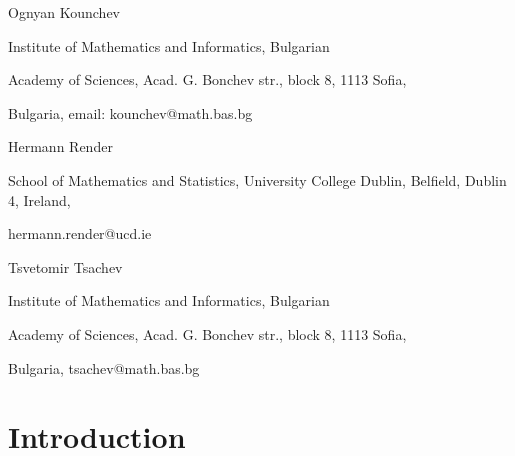 \documentclass[11pt]{article}%
\begin{document}
Ognyan Kounchev 

Institute of Mathematics and Informatics, Bulgarian

Academy of Sciences, Acad. G. Bonchev str., block 8, 1113 Sofia,

Bulgaria, email: kounchev@math.bas.bg 



Hermann Render 

School of Mathematics and Statistics, University College Dublin,  Belfield,
Dublin 4, Ireland,

hermann.render@ucd.ie

Tsvetomir Tsachev 

Institute of Mathematics and Informatics, Bulgarian

Academy of Sciences, Acad. G. Bonchev str., block 8, 1113 Sofia,

Bulgaria, tsachev@math.bas.bg



\section{Introduction}
\end{document}
